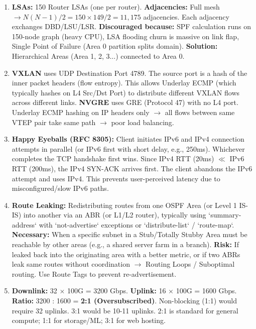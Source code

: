 \documentclass[11pt]{article}
\begin{document}
\begin{corrige}[Exercise 1]
\begin{enumerate}
\item \textbf{LSAs:} 150 Router LSAs (one per router). \textbf{Adjacencies:} Full mesh $\to N(N-1)/2 = 150 \times 149 / 2 = 11,175$ adjacencies. Each adjacency exchanges DBD/LSU/LSR. \textbf{Discouraged because:} SPF calculation runs on 150-node graph (heavy CPU), LSA flooding churn is massive on link flap, Single Point of Failure (Area 0 partition splits domain). \textbf{Solution:} Hierarchical Areas (Area 1, 2, 3...) connected to Area 0.
\item \textbf{VXLAN} uses UDP Destination Port 4789. The source port is a hash of the inner packet headers (flow entropy). This allows Underlay ECMP (which typically hashes on L4 Src/Dst Port) to distribute different VXLAN flows across different links. \textbf{NVGRE} uses GRE (Protocol 47) with no L4 port. Underlay ECMP hashing on IP headers only $\to$ all flows between same VTEP pair take same path $\to$ poor load balancing.
\item \textbf{Happy Eyeballs (RFC 8305):} Client initiates IPv6 and IPv4 connection attempts in parallel (or IPv6 first with short delay, e.g., 250ms). Whichever completes the TCP handshake first wins. Since IPv4 RTT (20ms) $\ll$ IPv6 RTT (200ms), the IPv4 SYN-ACK arrives first. The client abandons the IPv6 attempt and uses IPv4. This prevents user-perceived latency due to misconfigured/slow IPv6 paths.
\item \textbf{Route Leaking:} Redistributing routes from one OSPF Area (or Level 1 IS-IS) into another via an ABR (or L1/L2 router), typically using `summary-address` with `not-advertise` exceptions or `distribute-list` / `route-map`. \textbf{Necessary:} When a specific subnet in a Stub/Totally Stubby Area must be reachable by other areas (e.g., a shared server farm in a branch). \textbf{Risk:} If leaked back into the originating area with a better metric, or if two ABRs leak same routes without coordination $\to$ Routing Loops / Suboptimal routing. Use Route Tags to prevent re-advertisement.
\item \textbf{Downlink:} 32 $\times$ 100G = 3200 Gbps. \textbf{Uplink:} 16 $\times$ 100G = 1600 Gbps. \textbf{Ratio:} 3200 : 1600 = \textbf{2:1 (Oversubscribed)}. Non-blocking (1:1) would require 32 uplinks. 3:1 would be 10-11 uplinks. 2:1 is standard for general compute; 1:1 for storage/ML; 3:1 for web hosting.
\end{enumerate}
\end{corrige}
\end{document}
